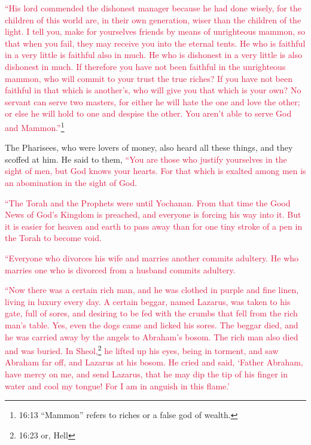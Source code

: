 \myverse{}\textcolor{crimson}{“His lord commended the dishonest manager because he had done wisely, for the children of this world are, in their own generation, wiser than the children of the light.} \myverse{}\textcolor{crimson}{I tell you, make for yourselves friends by means of unrighteous mammon, so that when you fail, they may receive you into the eternal tents.} \myverse{}\textcolor{crimson}{He who is faithful in a very little is faithful also in much. He who is dishonest in a very little is also dishonest in much.} \myverse{}\textcolor{crimson}{If therefore you have not been faithful in the unrighteous mammon, who will commit to your trust the true riches?} \myverse{}\textcolor{crimson}{If you have not been faithful in that which is another’s, who will give you that which is your own?} \myverse{}\textcolor{crimson}{No servant can serve two masters, for either he will hate the one and love the other; or else he will hold to one and despise the other. You aren’t able to serve God and Mammon.”}\footnote{16:13 “Mammon” refers to riches or a false god of wealth.}

\myverse{}The Pharisees, who were lovers of money, also heard all these
things, and they scoffed at him.
\myverse{}He said to them,
\textcolor{crimson}{“You are those who justify yourselves in the sight of men, but God knows your hearts. For that which
	is exalted among men is an abomination in the sight of God.
}

\myverse{}\textcolor{crimson}{“The Torah and the Prophets were until Yochanan. From that
	time the Good News of God’s Kingdom is preached, and everyone is forcing his way into it.
}
\myverse{}\textcolor{crimson}{But it is easier for heaven and earth to pass away than for one tiny
	stroke of a pen in the Torah to become void.
}

\myverse{}\textcolor{crimson}{“Everyone who divorces his wife and marries another commits
	adultery. He who marries one who is divorced from a husband commits adultery.
}

\myverse{}\textcolor{crimson}{“Now there was a certain rich man, and he was clothed in purple and fine linen, living in luxury every day.} \myverse{}\textcolor{crimson}{A certain beggar, named Lazarus, was taken to his gate, full of sores,} \myverse{}\textcolor{crimson}{and desiring to be fed with the crumbs that fell from the rich man’s table. Yes, even the dogs came and licked his sores.} \myverse{}\textcolor{crimson}{The beggar died, and he was carried away by the angels to Abraham’s bosom. The rich man also died and was buried.}
\myverse{}\textcolor{crimson}{In Sheol,}\footnote{16:23 or, Hell}
\textcolor{crimson}{he lifted up his eyes, being in torment, and saw Abraham far off, and Lazarus at his bosom.
}
\myverse{}\textcolor{crimson}{He cried and said, ‘Father Abraham, have mercy on me, and send Lazarus,
	that he may dip the tip of his finger in water and cool my tongue! For I am in anguish in this flame.’}


